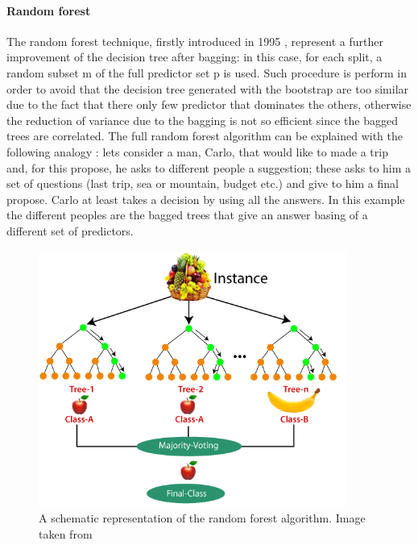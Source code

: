 \documentclass[
12pt, %
a4paper, %
oneside, %
headinclude,footinclude, %
BCOR5mm, %
]{scrartcl}
\begin{document}
\paragraph{Random forest} 
The random forest technique, firstly introduced in 1995 \cite{ho1995random}, represent a further improvement of the decision tree after bagging: in this case, for each split, a random subset m of the full predictor set p is used. Such procedure is perform in order to avoid that the decision tree generated with the bootstrap are too similar due to the fact that there only few predictor that dominates the others, otherwise the reduction of variance due to the bagging is not so efficient since the bagged trees are correlated. The full random forest algorithm can be explained with the following analogy \cite{rand_for_exp}: lets consider a man, Carlo,  that would like to made a trip and, for this propose,  he asks to different people a suggestion; these asks to him a set of questions (last trip, sea or mountain, budget etc.) and give to him a final propose. Carlo at least takes a decision by using all the answers. In this example the different peoples are the bagged trees that give an answer basing of a different set of predictors. 
\begin{figure}[h]
\begin{center}
\includegraphics[width=0.9\textwidth]{Pic/random-forest-algorithm2.png}
\caption{A schematic representation of the random forest algorithm. Image taken from \cite{rand_for_fig}}
\label{Noisy_channel}
\end{center}
\end{figure}
\end{document}
